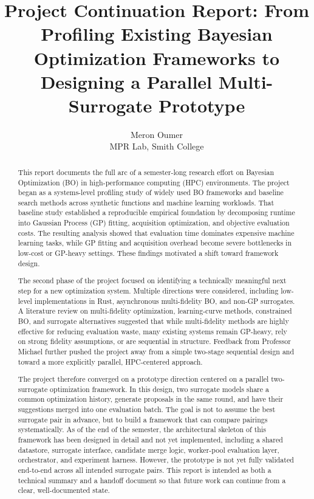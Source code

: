 \documentclass[11pt]{article}
\title{\textbf{Project Continuation Report: From Profiling Existing Bayesian Optimization Frameworks to Designing a Parallel Multi-Surrogate Prototype}}
\author{Meron Oumer\\
MPR Lab, Smith College}
\begin{document}
\maketitle

\begin{abstract}
This report documents the full arc of a semester-long research effort on Bayesian Optimization (BO) in high-performance computing (HPC) environments. The project began as a systems-level profiling study of widely used BO frameworks and baseline search methods across synthetic functions and machine learning workloads. That baseline study established a reproducible empirical foundation by decomposing runtime into Gaussian Process (GP) fitting, acquisition optimization, and objective evaluation costs. The resulting analysis showed that evaluation time dominates expensive machine learning tasks, while GP fitting and acquisition overhead become severe bottlenecks in low-cost or GP-heavy settings. These findings motivated a shift toward framework design.

The second phase of the project focused on identifying a technically meaningful next step for a new optimization system. Multiple directions were considered, including low-level implementations in Rust, asynchronous multi-fidelity BO, and non-GP surrogates. A literature review on multi-fidelity optimization, learning-curve methods, constrained BO, and surrogate alternatives suggested that while multi-fidelity methods are highly effective for reducing evaluation waste, many existing systems remain GP-heavy, rely on strong fidelity assumptions, or are sequential in structure.  Feedback from Professor Michael further pushed the project away from a simple two-stage sequential design and toward a more explicitly parallel, HPC-centered approach.

The project therefore converged on a prototype direction centered on a parallel two-surrogate optimization framework. In this design, two surrogate models share a common optimization history, generate proposals in the same round, and have their suggestions merged into one evaluation batch. The goal is not to assume the best surrogate pair in advance, but to build a framework that can compare pairings systematically. As of the end of the semester, the architectural skeleton of this framework has been designed in detail and not yet implemented, including a shared datastore, surrogate interface, candidate merge logic, worker-pool evaluation layer, orchestrator, and experiment harness. However, the prototype is not yet fully validated end-to-end across all intended surrogate pairs. This report is intended as both a technical summary and a handoff document so that future work can continue from a clear, well-documented state.
\end{abstract}
\end{document}
